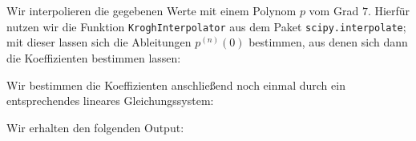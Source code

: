 \section{}

Wir interpolieren die gegebenen Werte mit einem Polynom $p$ vom Grad $7$.
Hierfür nutzen wir die Funktion \texttt{KroghInterpolator} aus dem Paket \texttt{scipy.interpolate};
mit dieser lassen sich die Ableitungen $p^{(n)}(0)$ bestimmen, aus denen sich dann die Koeffizienten bestimmen lassen:



Wir bestimmen die Koeffizienten anschließend noch einmal durch ein entsprechendes lineares Gleichungssystem:



Wir erhalten den folgenden Output:

